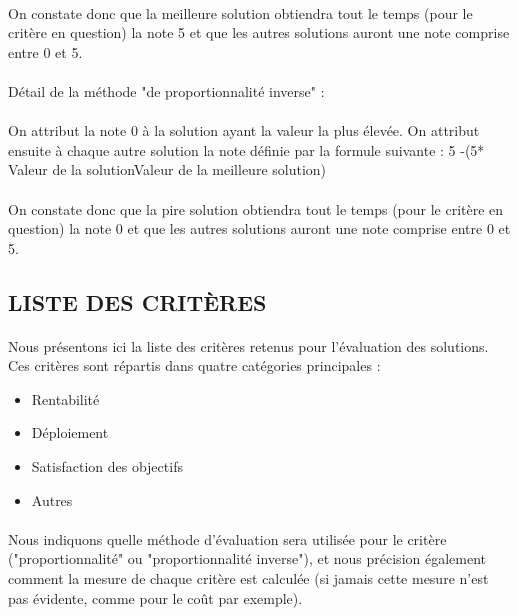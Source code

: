 \paragraph{} On constate donc que la meilleure solution obtiendra tout le temps (pour le critère en question) la note 5 et que les autres solutions auront une note comprise entre 0 et 5.

\paragraph{} Détail de la méthode "de proportionnalité inverse" :
\paragraph{} On attribut la note 0 à la solution ayant la valeur la plus élevée. On attribut ensuite à chaque autre solution la note définie par la formule suivante : 5 -(5* Valeur de la solutionValeur de la meilleure solution)
\paragraph{} On constate donc que la pire solution obtiendra tout le temps (pour le critère en question) la note 0 et que les autres solutions auront une note comprise entre 0 et 5.

\subsection{LISTE DES CRITÈRES}

\paragraph{} Nous présentons ici la liste des critères retenus pour l'évaluation des solutions. Ces critères sont répartis dans quatre catégories principales :

\begin{itemize}
\item Rentabilité
\item Déploiement
\item Satisfaction des objectifs
\item Autres
\end{itemize}

\paragraph{} Nous indiquons quelle méthode d'évaluation sera utilisée pour le critère ("proportionnalité" ou "proportionnalité inverse"), et nous précision également comment la mesure de chaque critère est calculée (si jamais cette mesure n'est pas évidente, comme pour le coût par exemple).

